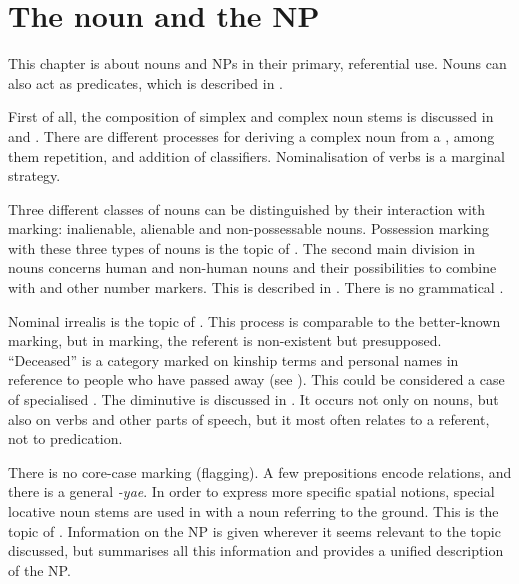 
\chapter{The noun and the NP}\label{chapter:Nouns}

This chapter is about nouns and NPs in their primary, referential use. Nouns can also act as predicates, which is described in .%

First of all, the composition of simplex and complex noun stems is discussed in  and . There are different processes for deriving a complex noun from a , among them repetition,  and addition of classifiers. Nominalisation of verbs is a marginal strategy.

Three different classes of nouns can be distinguished by their interaction with  marking: inalienable, alienable and non-possessable nouns. Possession marking with these three types of nouns is the topic of . The second main division in nouns concerns human and non-human nouns and their possibilities to combine with  and other number markers. This is described in . There is no grammatical .

Nominal irrealis is the topic of . This process is comparable to the better-known  marking, but in  marking, the referent is non-existent but presupposed. “Deceased” is a category marked on kinship terms and personal names in reference to people who have passed away (see ). This could be considered a case of specialised . The diminutive is discussed in . It occurs not only on nouns, but also on verbs and other parts of speech, but it most often relates to a referent, not to predication.

There is no core-case marking (flagging). A few prepositions encode  relations, and there is a general  \textit{-yae}. In order to express more specific spatial notions, special locative noun stems are used in  with a noun referring to the ground. This is the topic of . Information on the NP is given wherever it seems relevant to the topic discussed, but  summarises all this information and provides a unified description of the NP.

